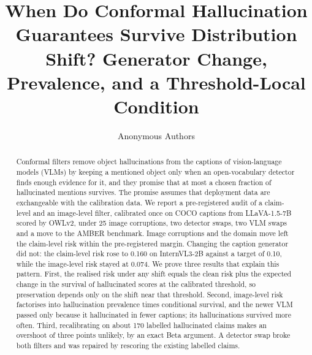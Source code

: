 \documentclass[journal]{IEEEtran}
\newif\ifanon\anontrue
\theoremstyle{remark}\newtheorem{remark}{Remark}
\begin{document}
\title{When Do Conformal Hallucination Guarantees Survive Distribution Shift? Generator Change, Prevalence, and a Threshold-Local Condition}

\ifanon
\author{Anonymous Authors}
\else
\author{S.~Raja, A.~Antony~Selva~Jasfer, Akash~Narayanan~C, U.~Priyan, and Nisanth~S%
\thanks{S.~Raja is with the Department of Mathematics, Amrita School of Computing, Amrita Vishwa Vidyapeetham, Nagercoil 629001, India (e-mail: nellairajaa@yahoo.com).}%
\thanks{A.~Antony Selva Jasfer, Akash Narayanan C, U.~Priyan and Nisanth S are with the Department of Artificial Intelligence and Data Science, Amrita School of Computing, Amrita Vishwa Vidyapeetham, Nagercoil 629001, India.}}
\fi


\maketitle

\begin{abstract}
Conformal filters remove object hallucinations from the captions of vision-language models (VLMs) by keeping a mentioned object only when an open-vocabulary detector finds enough evidence for it, and they promise that at most a chosen fraction of hallucinated mentions survives. The promise assumes that deployment data are exchangeable with the calibration data. We report a pre-registered audit of a claim-level and an image-level filter, calibrated once on COCO captions from LLaVA-1.5-7B scored by OWLv2, under 25 image corruptions, two detector swaps, two VLM swaps and a move to the AMBER benchmark. Image corruptions and the domain move left the claim-level risk within the pre-registered margin. Changing the caption generator did not: the claim-level risk rose to 0.160 on InternVL3-2B against a target of 0.10, while the image-level risk stayed at 0.074. We prove three results that explain this pattern. First, the realised risk under any shift equals the clean risk plus the expected change in the survival of hallucinated scores at the calibrated threshold, so preservation depends only on the shift near that threshold. Second, image-level risk factorises into hallucination prevalence times conditional survival, and the newer VLM passed only because it hallucinated in fewer captions; its hallucinations survived more often. Third, recalibrating on about 170 labelled hallucinated claims makes an overshoot of three points unlikely, by an exact Beta argument. A detector swap broke both filters and was repaired by rescoring the existing labelled claims.
\end{abstract}
\end{document}
